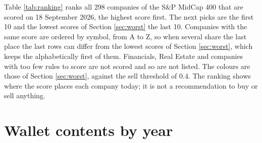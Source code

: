 \documentclass[11pt,a4paper]{article}
\begin{document}
Table \ref{tab:ranking} ranks all 298 companies of the S\&P MidCap 400 that are scored on 18 September 2026, the highest score first. The next picks are the first 10 and the lowest scores of Section \ref{sec:worst} the last 10. Companies with the same score are ordered by symbol, from A to Z, so when several share the last place the last rows can differ from the lowest scores of Section \ref{sec:worst}, which keeps the alphabetically first of them. Financials, Real Estate and companies with too few rules to score are not scored and so are not listed. The colours are those of Section \ref{sec:worst}, against the sell threshold of 0.4. The ranking shows where the score places each company today; it is not a recommendation to buy or sell anything.

\section{Wallet contents by year}
\label{app:contents}
\end{document}
